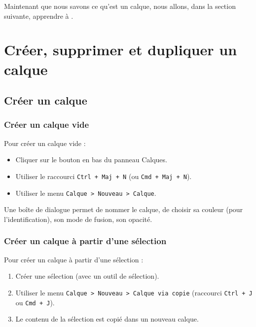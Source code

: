 Maintenant que nous savons ce qu'est un calque, nous allons, dans la section suivante, apprendre à .

\section{Créer, supprimer et dupliquer un calque}

\subsection{Créer un calque}

\subsubsection{Créer un calque vide}

Pour créer un calque vide :

\begin{itemize}
    \item Cliquer sur le bouton  en bas du panneau Calques.
    \item Utiliser le raccourci \texttt{Ctrl + Maj + N} (ou \texttt{Cmd + Maj + N}).
    \item Utiliser le menu \texttt{Calque > Nouveau > Calque}.
\end{itemize}

Une boîte de dialogue permet de nommer le calque, de choisir sa couleur (pour l'identification), son mode de fusion, son opacité.

\subsubsection{Créer un calque à partir d'une sélection}

Pour créer un calque à partir d'une sélection :

\begin{enumerate}
    \item Créer une sélection (avec un outil de sélection).
    \item Utiliser le menu \texttt{Calque > Nouveau > Calque via copie} (raccourci \texttt{Ctrl + J} ou \texttt{Cmd + J}).
    \item Le contenu de la sélection est copié dans un nouveau calque.
\end{enumerate}

